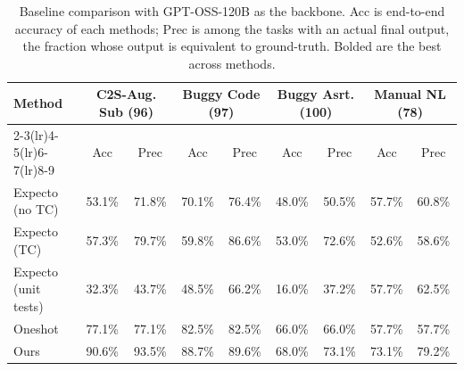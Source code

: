 \begin{table}[t]
\centering
\small
\setlength{\tabcolsep}{3pt}
\renewcommand{\arraystretch}{1.15}
\begin{tabular}{lcccccccc}
\toprule
\textbf{Method} & \multicolumn{2}{c}{\textbf{C2S-Aug. Sub (96)}} & \multicolumn{2}{c}{\textbf{Buggy Code (97)}} & \multicolumn{2}{c}{\textbf{Buggy Asrt. (100)}} & \multicolumn{2}{c}{\textbf{Manual NL (78)}} \\
\cmidrule(lr){2-3}\cmidrule(lr){4-5}\cmidrule(lr){6-7}\cmidrule(lr){8-9}
& Acc & Prec & Acc & Prec & Acc & Prec & Acc & Prec \\
\midrule
Expecto (no TC) & 53.1\% & 71.8\% & 70.1\% & 76.4\% & 48.0\% & 50.5\% & 57.7\% & 60.8\% \\
Expecto (TC) & 57.3\% & 79.7\% & 59.8\% & 86.6\% & 53.0\% & 72.6\% & 52.6\% & 58.6\% \\
Expecto (unit tests) & 32.3\% & 43.7\% & 48.5\% & 66.2\% & 16.0\% & 37.2\% & 57.7\% & 62.5\% \\
Oneshot & 77.1\% & 77.1\% & 82.5\% & 82.5\% & 66.0\% & 66.0\% & 57.7\% & 57.7\% \\
Ours & 90.6\% & 93.5\% & 88.7\% & 89.6\% & 68.0\% & 73.1\% & 73.1\% & 79.2\% \\
\bottomrule
\end{tabular}
\vspace{0.4em}
\caption{Baseline comparison with GPT-OSS-120B as the backbone. Acc is end-to-end accuracy of each methods; Prec is among the tasks with an actual final output, the fraction whose output is equivalent to ground-truth. Bolded are the best across methods.}
\label{tab:baseline-comparison-sub}
\end{table}